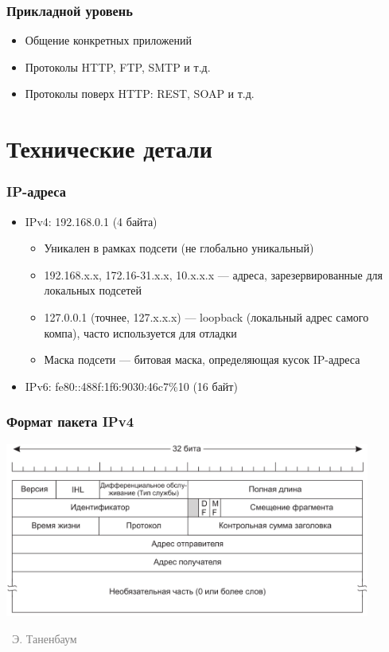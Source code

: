 \documentclass[xetex,mathserif,serif]{beamer}
\newcommand{\attribution}[1] {
\vspace{-5mm}\begin{flushright}\begin{scriptsize}\textcolor{gray}{\textcopyright\, #1}\end{scriptsize}\end{flushright}
}
\begin{document}
	\begin{frame}
		\frametitle{Прикладной уровень}
		\begin{itemize}
			\item Общение конкретных приложений
			\item Протоколы HTTP, FTP, SMTP и т.д.
			\item Протоколы поверх HTTP: REST, SOAP и т.д.
		\end{itemize}
	\end{frame}

	\section{Технические детали}

	\begin{frame}
		\frametitle{IP-адреса}
		\begin{itemize}
			\item IPv4: 192.168.0.1 (4 байта)
			\begin{itemize}
				\item Уникален в рамках подсети (не глобально уникальный)
				\item 192.168.x.x, 172.16-31.x.x, 10.x.x.x --- адреса, зарезервированные для локальных подсетей
				\item 127.0.0.1 (точнее, 127.x.x.x) --- loopback (локальный адрес самого компа), часто используется для отладки
				\item Маска подсети --- битовая маска, определяющая кусок IP-адреса
			\end{itemize}
			\item IPv6: fe80::488f:1f6:9030:46c7\%10 (16 байт)
		\end{itemize}
	\end{frame}

	\begin{frame}
		\frametitle{Формат пакета IPv4}
		\begin{center}
			\includegraphics[width=0.9\textwidth]{ipv4.png}
			\attribution{Э. Таненбаум}
		\end{center}
	\end{frame}
\end{document}
